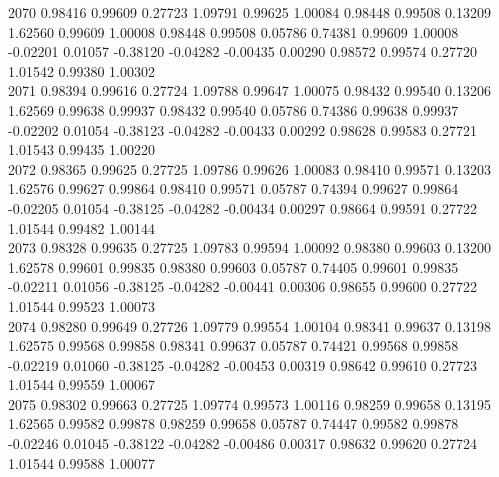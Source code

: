 {2070 0.98416 0.99609 0.27723 1.09791 0.99625 1.00084 0.98448 0.99508 0.13209 1.62560 0.99609 1.00008 0.98448 0.99508 0.05786 0.74381 0.99609 1.00008 -0.02201 0.01057 -0.38120 -0.04282 -0.00435 0.00290 0.98572 0.99574 0.27720 1.01542 0.99380 1.00302 \\
2071 0.98394 0.99616 0.27724 1.09788 0.99647 1.00075 0.98432 0.99540 0.13206 1.62569 0.99638 0.99937 0.98432 0.99540 0.05786 0.74386 0.99638 0.99937 -0.02202 0.01054 -0.38123 -0.04282 -0.00433 0.00292 0.98628 0.99583 0.27721 1.01543 0.99435 1.00220 \\
2072 0.98365 0.99625 0.27725 1.09786 0.99626 1.00083 0.98410 0.99571 0.13203 1.62576 0.99627 0.99864 0.98410 0.99571 0.05787 0.74394 0.99627 0.99864 -0.02205 0.01054 -0.38125 -0.04282 -0.00434 0.00297 0.98664 0.99591 0.27722 1.01544 0.99482 1.00144 \\
2073 0.98328 0.99635 0.27725 1.09783 0.99594 1.00092 0.98380 0.99603 0.13200 1.62578 0.99601 0.99835 0.98380 0.99603 0.05787 0.74405 0.99601 0.99835 -0.02211 0.01056 -0.38125 -0.04282 -0.00441 0.00306 0.98655 0.99600 0.27722 1.01544 0.99523 1.00073 \\
2074 0.98280 0.99649 0.27726 1.09779 0.99554 1.00104 0.98341 0.99637 0.13198 1.62575 0.99568 0.99858 0.98341 0.99637 0.05787 0.74421 0.99568 0.99858 -0.02219 0.01060 -0.38125 -0.04282 -0.00453 0.00319 0.98642 0.99610 0.27723 1.01544 0.99559 1.00067 \\
2075 0.98302 0.99663 0.27725 1.09774 0.99573 1.00116 0.98259 0.99658 0.13195 1.62565 0.99582 0.99878 0.98259 0.99658 0.05787 0.74447 0.99582 0.99878 -0.02246 0.01045 -0.38122 -0.04282 -0.00486 0.00317 0.98632 0.99620 0.27724 1.01544 0.99588 1.00077 \\
}\hspread
